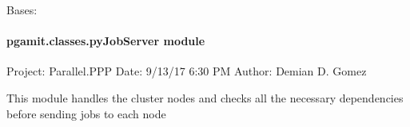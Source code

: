 \documentclass[letterpaper,10pt,english]{sphinxmanual}
\begin{document}

\begin{fulllineitems}
\label{\detokenize{pgamit.classes:pgamit.classes.pyGlobkTask.GlobkException}}
\pysigstartsignatures
\pysiglinewithargsret
{}
{}
{}
\pysigstopsignatures
\sphinxAtStartPar
Bases: 

\end{fulllineitems}



\paragraph{pgamit.classes.pyJobServer module}
\label{\detokenize{pgamit.classes:module-pgamit.classes.pyJobServer}}\label{\detokenize{pgamit.classes:pgamit-classes-pyjobserver-module}}
\sphinxAtStartPar
Project: Parallel.PPP
Date: 9/13/17 6:30 PM
Author: Demian D. Gomez

\sphinxAtStartPar
This module handles the cluster nodes and checks all the necessary dependencies
before sending jobs to each node
\end{document}
